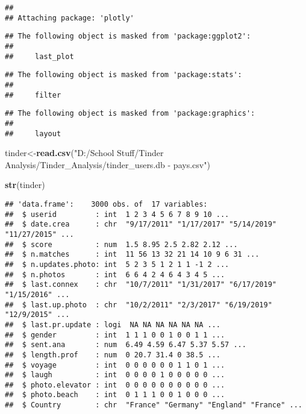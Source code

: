\documentclass[
]{article}
\newenvironment{Shaded}{\begin{snugshade}}{\end{snugshade}}
\newcommand{\FunctionTok}[1]{\textcolor[rgb]{0.13,0.29,0.53}{\textbf{#1}}}
\newcommand{\NormalTok}[1]{#1}
\newcommand{\OtherTok}[1]{\textcolor[rgb]{0.56,0.35,0.01}{#1}}
\newcommand{\StringTok}[1]{\textcolor[rgb]{0.31,0.60,0.02}{#1}}
\begin{document}
\begin{verbatim}
## 
## Attaching package: 'plotly'
\end{verbatim}

\begin{verbatim}
## The following object is masked from 'package:ggplot2':
## 
##     last_plot
\end{verbatim}

\begin{verbatim}
## The following object is masked from 'package:stats':
## 
##     filter
\end{verbatim}

\begin{verbatim}
## The following object is masked from 'package:graphics':
## 
##     layout
\end{verbatim}

\begin{Shaded}
\begin{Highlighting}[]
\NormalTok{tinder}\OtherTok{\textless{}{-}}\FunctionTok{read.csv}\NormalTok{(}\StringTok{"D:/School Stuff/Tinder Analysis/Tinder\_Analysis/tinder\_users.db {-} pays.csv"}\NormalTok{)}

\FunctionTok{str}\NormalTok{(tinder)}
\end{Highlighting}
\end{Shaded}

\begin{verbatim}
## 'data.frame':    3000 obs. of  17 variables:
##  $ userid         : int  1 2 3 4 5 6 7 8 9 10 ...
##  $ date.crea      : chr  "9/17/2011" "1/17/2017" "5/14/2019" "11/27/2015" ...
##  $ score          : num  1.5 8.95 2.5 2.82 2.12 ...
##  $ n.matches      : int  11 56 13 32 21 14 10 9 6 31 ...
##  $ n.updates.photo: int  5 2 3 5 1 2 1 1 -1 2 ...
##  $ n.photos       : int  6 6 4 2 4 6 4 3 4 5 ...
##  $ last.connex    : chr  "10/7/2011" "1/31/2017" "6/17/2019" "1/15/2016" ...
##  $ last.up.photo  : chr  "10/2/2011" "2/3/2017" "6/19/2019" "12/9/2015" ...
##  $ last.pr.update : logi  NA NA NA NA NA NA ...
##  $ gender         : int  1 1 1 0 0 1 0 0 1 1 ...
##  $ sent.ana       : num  6.49 4.59 6.47 5.37 5.57 ...
##  $ length.prof    : num  0 20.7 31.4 0 38.5 ...
##  $ voyage         : int  0 0 0 0 0 0 1 1 0 1 ...
##  $ laugh          : int  0 0 0 0 1 0 0 0 0 0 ...
##  $ photo.elevator : int  0 0 0 0 0 0 0 0 0 0 ...
##  $ photo.beach    : int  0 1 1 1 0 0 1 0 0 0 ...
##  $ Country        : chr  "France" "Germany" "England" "France" ...
\end{verbatim}
\end{document}
